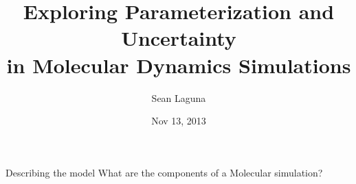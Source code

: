 \documentclass{beamer}
\title[Parameterization and Uncertainty in MD Simulations]
      {Exploring Parameterization and Uncertainty \\
       in Molecular Dynamics Simulations}
\author{Sean Laguna}
\institute{University of Chicago}
\date{Nov 13, 2013}
\begin{document}
\begin{frame}
\titlepage
\end{frame}


\begin{frame}{Describing the model}
What are the components of a Molecular simulation?
\end{frame}
\end{document}
